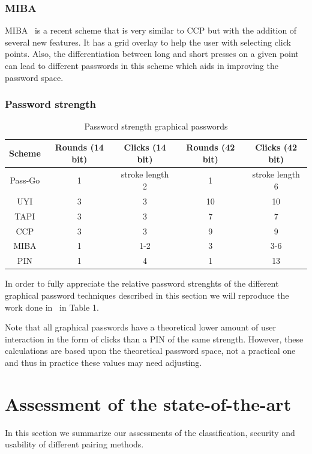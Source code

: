 \documentclass[conference, 11pt]{sty/IEEEtran}
\begin{document}
\subsubsection{MIBA}
\label{sssec:miba}

MIBA~\cite{ritter2013miba} is a recent scheme that is very similar to CCP but with the addition of several new features.
It has a grid overlay to help the user with selecting click points.
Also, the differentiation between long and short presses on a given point can lead to different passwords in this scheme which aids in improving the password space.

\subsubsection{Password strength}
\label{sssec:password_strength}

\begin{table}[t]
    \centering
    \normalsize{
    \begin{tabular}{c c c c c}
        Scheme & Rounds (14 bit) & Clicks (14 bit) & Rounds (42 bit) & Clicks (42 bit) \\
        \hline
        Pass-Go & 1 & stroke length 2 & 1 & stroke length 6 \\
        UYI & 3 & 3 & 10 & 10 \\
        TAPI & 3 & 3 & 7 & 7 \\
        CCP & 3 & 3 & 9 & 9 \\
        MIBA & 1 & 1-2 & 3 & 3-6 \\
        PIN & 1 & 4 & 1 & 13 \\
    \end{tabular}
    }
    \label{fig:pw}
    \caption{Password strength graphical passwords}
\end{table}

In order to fully appreciate the relative password strenghts of the different graphical password techniques described in this section we will reproduce the work done in~\cite{schaub2013exploring} in 
Table 1.

Note that all graphical passwords have a theoretical lower amount of user interaction in the form of clicks than a PIN of the same strength.
However, these calculations are based upon the theoretical password space, not a practical one and thus in practice these values may need adjusting.

\section{Assessment of the state-of-the-art}
\label{sec:assessment_of_the_state_of_the_art}
In this section we summarize our assessments of the classification, security and usability of different pairing methods.
\end{document}
